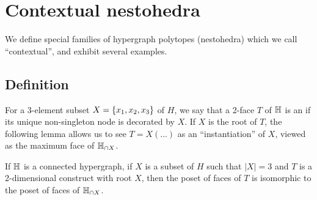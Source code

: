 
\section{Contextual nestohedra} 
\label{s:contextual}

We define special families of hypergraph polytopes (nestohedra) which we call ``contextual'', and exhibit several examples.


\subsection{Definition}

For a 3-element subset $X=\left\{x_1,x_2,x_3\right\}$ of $H$, we say that a 2-face $T$  of ${\mathbb H}$ is an  if its unique non-singleton node is decorated by $X$.  
If $X$ is the root of $T$, the following  lemma allows us to see $T=X(\ldots)$ as an ``instantiation'' of $X$, viewed as the maximum face of ${\mathbb H}_{\cap X}$.

\begin{lemma} \label{instance-construct} 
  If ${\mathbb H}$ is a connected hypergraph, if $X$ is a subset of $H$ such that $|X|=3$ and $T$ is a 2-dimensional construct with root $X$, then the poset of faces of $T$ is isomorphic to the poset of faces of ${\mathbb H}_{\cap X}$.
 \end{lemma}
 
